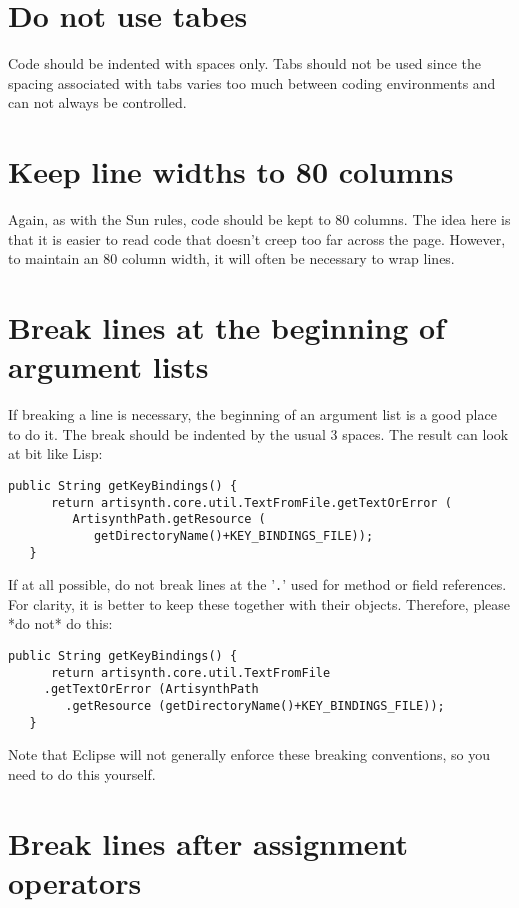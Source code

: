 \documentclass{article}
\begin{document}
\section{Do not use tabes}

Code should be indented with spaces only. Tabs should not be used
since the spacing associated with tabs varies too much between coding
environments and can not always be controlled.

\section{Keep line widths to 80 columns}

Again, as with the Sun rules, code should be kept to 80 columns.  The
idea here is that it is easier to read code that doesn't creep too far
across the page. However, to maintain an 80 column width, it will
often be necessary to wrap lines.

\section{Break lines at the beginning of argument lists}

If breaking a line is necessary, the beginning of an argument list is
a good place to do it. The break should be indented by the usual 3 spaces.
The result can look at bit like Lisp:
\begin{lstlisting}[]
   public String getKeyBindings() {
      return artisynth.core.util.TextFromFile.getTextOrError (
         ArtisynthPath.getResource (
            getDirectoryName()+KEY_BINDINGS_FILE));
   }
\end{lstlisting}

If at all possible, do not break lines at the '{\tt .}' used for method or
field references. For clarity, it is better to keep these together with 
their objects. Therefore, please *do not* do this:
\begin{lstlisting}[]
   public String getKeyBindings() {
      return artisynth.core.util.TextFromFile
	 .getTextOrError (ArtisynthPath
	    .getResource (getDirectoryName()+KEY_BINDINGS_FILE));
   }
\end{lstlisting}

Note that Eclipse will not generally enforce these breaking
conventions, so you need to do this yourself.

\section{Break lines after assignment operators}
\end{document}
